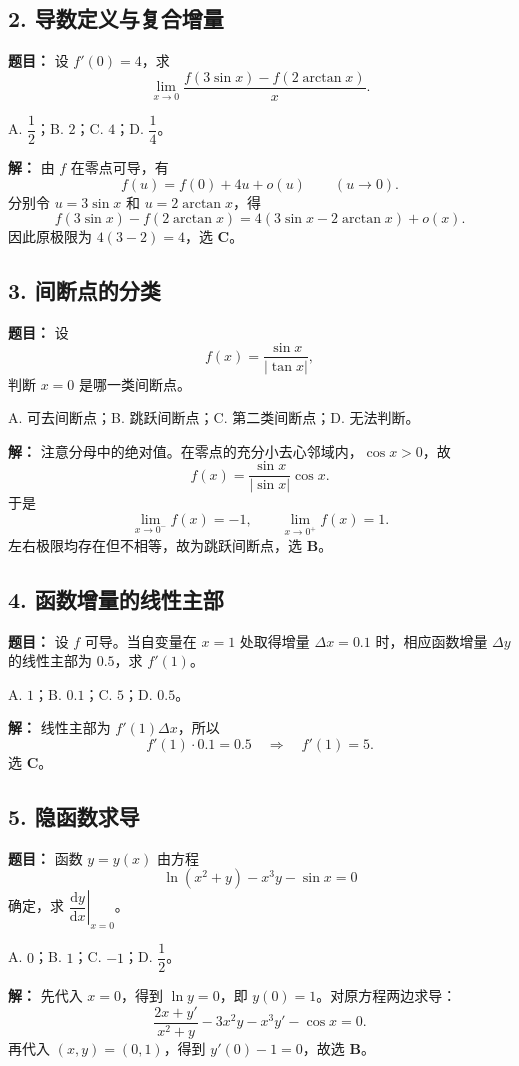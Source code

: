 \documentclass[UTF8,a4paper,11pt,fontset=fandol]{ctexart}
\begin{document}
\subsection*{2. 导数定义与复合增量}

\textbf{题目：} 设 $f'(0)=4$，求
\[
\lim_{x\to0}\frac{f(3\sin x)-f(2\arctan x)}x.
\]

A. $\dfrac12$；B. $2$；C. $4$；D. $\dfrac14$。

\textbf{解：} 由 $f$ 在零点可导，有
\[
f(u)=f(0)+4u+o(u)\qquad(u\to0).
\]
分别令 $u=3\sin x$ 和 $u=2\arctan x$，得
\[
f(3\sin x)-f(2\arctan x)
=4(3\sin x-2\arctan x)+o(x).
\]
因此原极限为 $4(3-2)=4$，选 \textbf{C}。

\subsection*{3. 间断点的分类}

\textbf{题目：} 设
\[
f(x)=\frac{\sin x}{|\tan x|},
\]
判断 $x=0$ 是哪一类间断点。

A. 可去间断点；B. 跳跃间断点；C. 第二类间断点；D. 无法判断。

\textbf{解：} 注意分母中的绝对值。在零点的充分小去心邻域内，$\cos x>0$，故
\[
f(x)=\frac{\sin x}{|\sin x|}\cos x.
\]
于是
\[
\lim_{x\to0^-}f(x)=-1,\qquad
\lim_{x\to0^+}f(x)=1.
\]
左右极限均存在但不相等，故为跳跃间断点，选 \textbf{B}。

\subsection*{4. 函数增量的线性主部}

\textbf{题目：} 设 $f$ 可导。当自变量在 $x=1$ 处取得增量 $\Delta x=0.1$ 时，相应函数增量 $\Delta y$ 的线性主部为 $0.5$，求 $f'(1)$。

A. $1$；B. $0.1$；C. $5$；D. $0.5$。

\textbf{解：} 线性主部为 $f'(1)\Delta x$，所以
\[
f'(1)\cdot0.1=0.5\quad\Longrightarrow\quad f'(1)=5.
\]
选 \textbf{C}。

\subsection*{5. 隐函数求导}

\textbf{题目：} 函数 $y=y(x)$ 由方程
\[
\ln(x^2+y)-x^3y-\sin x=0
\]
确定，求 $\left.\dfrac{\mathrm{d}y}{\mathrm{d}x}\right|_{x=0}$。

A. $0$；B. $1$；C. $-1$；D. $\dfrac12$。

\textbf{解：} 先代入 $x=0$，得到 $\ln y=0$，即 $y(0)=1$。对原方程两边求导：
\[
\frac{2x+y'}{x^2+y}-3x^2y-x^3y'-\cos x=0.
\]
再代入 $(x,y)=(0,1)$，得到 $y'(0)-1=0$，故选 \textbf{B}。
\end{document}
